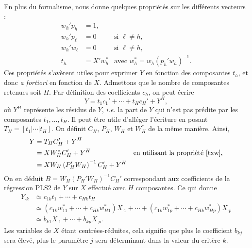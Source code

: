 En plus du formalisme, \citet{tenenhaus} nous donne quelques propriétés sur les différents vecteurs :
\begin{align}
 w_h'p_h &= 1,  \\
 w_h'p_{\ell} &= 0 &\text{si $\ell \neq h$,}\\
 w_h'w_{\ell} &= 0 &\text{si $\ell \neq h$,}\\
 t_h &= X'w_h^* &\text{avec $w_h^* = w_h (p_h'w_h)^{-1}$.} \label{txw}
\end{align}
Ces propriétés s'avèrent utiles pour exprimer $Y$ en fonction des composantes $t_h$, et donc \emph{a fortiori} en fonction de $X$.
Admettons que le nombre de composantes retenues soit $H$.
Par définition des coefficients $c_h$, on peut écrire 
\[
Y = t_1c_1' + \cdots + t_Hc_H' + Y^{H},
\]
où $Y^{H}$ représente les résidus de $Y$, \emph{i.e.} la part de $Y$ qui n'est pas prédite par les composantes $t_1,\ldots,t_H.$
Il peut être utile d'alléger l'écriture en posant $T_H = [t_1 | \cdots | t_H]$. 
On définit $C_H$, $P_H$, $W_H$ et $W_H^*$ de la même manière.
Ainsi,
\begin{align*}
 Y &= T_HC_H' + Y^H\\
 &= XW_H^*C_H' + Y^H & \text{en utilisant la propriété~\ref{txw},}\\
 &= XW_H\left( P_H'W_H \right)^{-1}C_H' + Y^H
\end{align*}
On en déduit $B = W_H\left( P_H'W_H \right)^{-1}C_H'$ correspondant aux coefficients de la régression PLS2 de $Y$ sur $X$ effectué avec $H$ composantes.
Ce qui donne
\begin{align*}
Y_{\cdot k} &\simeq c_{1k}t_1 + \cdots + c_{Hk}t_H\\
&\simeq \left( c_{1k}w_{11}^* + \cdots + c_{Hk}w_{H1}^* \right)X_{\cdot 1} + \cdots + \left( c_{1k}w_{1p}^* + \cdots + c_{Hk}w_{Hp}^* \right)X_{\cdot p}\\
&\simeq b_{k1}X_{\cdot 1} + \cdots + b_{kp}X_{\cdot p}.
\end{align*}
Les variables de $X$ étant centrées-réduites, cela signifie que plus le coefficient $b_{kj}$ sera élevé, plus le paramètre $j$ sera déterminant dans la valeur du critère $k$.










